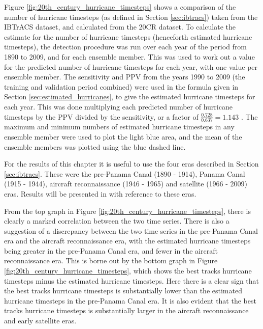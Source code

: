 \documentclass[pdftex,12pt,a4paper]{report}
\begin{document}
Figure \ref{fig:20th_century_hurricane_timesteps} shows a comparison of the number of hurricane
timesteps (as defined in Section \ref{sec:ibtracs}) taken from the IBTrACS dataset, and calculated
from the 20CR dataset. To calculate the estimate for the number of hurricane timesteps (henceforth
estimated hurricane timesteps), the detection procedure was run over each year of the period from
1890 to 2009, and for each ensemble member. This was used to work out a value for the predicted
number of hurricane timesteps for each year, with one value per ensemble member. The sensitivity and
PPV from the years 1990 to 2009 (the training and validation period combined) were used in the
formula given in Section \ref{sec:estimated_hurricanes}, to give the estimated hurricane timesteps
for each year. This was done multiplying each predicted number of hurricane timesteps by the PPV
divided by the sensitivity, or a factor of $\frac{0.728}{0.637} = 1.143$ . The maximum and minimum
numbers of estimated hurricane timesteps in any ensemble member were used to plot the light blue
area, and the mean of the ensemble members was plotted using the blue dashed line.

For the results of this chapter it is useful to use the four eras described in Section
\ref{sec:ibtracs}. These were the pre-Panama Canal (1890 - 1914), Panama Canal (1915 - 1944),
aircraft reconnaissance (1946 - 1965) and satellite (1966 - 2009) eras. Results will be presented in
with reference to these eras.

From the top graph in Figure \ref{fig:20th_century_hurricane_timesteps}, there is clearly a marked
correlation between the two time series. There is also a suggestion of a discrepancy between the two
time series in the pre-Panama Canal era and the aircraft reconnaissance era, with the estimated
hurricane timesteps being greater in the pre-Panama Canal era, and fewer in the
aircraft reconnaissance era. This is borne out by the bottom graph in Figure 
\ref{fig:20th_century_hurricane_timesteps}, which shows the best tracks hurricane timesteps minus the
estimated hurricane timesteps. Here there is a clear sign that the best tracks hurricane timesteps
is substantially lower than the estimated hurricane timesteps in the pre-Panama Canal era. It is
also evident that the best tracks hurricane timesteps is substantially larger in the aircraft
reconnaissance and early satellite eras.
\end{document}
